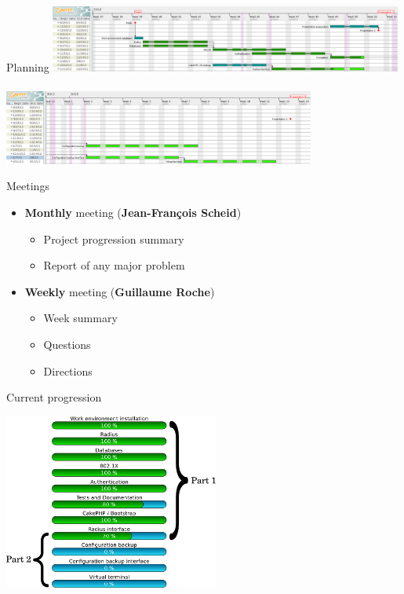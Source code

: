 \documentclass[12pt]{beamer}
\begin{document}
\begin{frame}{Planning}
	\includegraphics[width=330pt]{img/gantt_en_part1.pdf}\\
~\\
	\includegraphics[height=70pt]{img/gantt_en_part2.pdf}
\end{frame}

\begin{frame}{Meetings}
\begin{itemize}
    \item \textbf{Monthly} meeting (\textbf{Jean-François Scheid})
	\vspace{0.2cm}
	\begin{itemize}
	\item Project progression summary
	\item Report of any major problem
	\end{itemize}
	\vspace{0.8cm}\pause
    \item \textbf{Weekly} meeting (\textbf{Guillaume Roche})
	\vspace{0.2cm}
	\begin{itemize}
	\item Week summary
	\item Questions
	\item Directions
	\end{itemize}
    \end{itemize}
\end{frame}

\begin{frame}{Current progression}
    \begin{center}
         \includegraphics[width=200pt]{img/progress.pdf}
    \end{center}
\end{frame}
\end{document}
